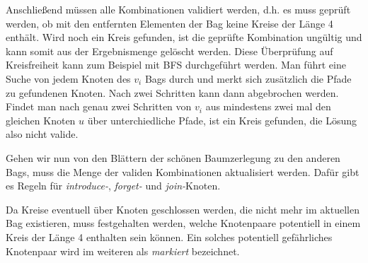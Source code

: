 Anschließend müssen alle Kombinationen validiert werden, d.h. es muss geprüft werden, ob mit den entfernten Elementen der Bag keine Kreise der Länge 4 enthält. Wird noch ein Kreis gefunden, ist die geprüfte Kombination ungültig und kann somit aus der Ergebnismenge gelöscht werden. Diese Überprüfung auf Kreisfreiheit kann zum Beispiel mit BFS durchgeführt werden. Man führt eine Suche von jedem Knoten des $v_i$ Bags durch und merkt sich zusätzlich die Pfade zu gefundenen Knoten. Nach zwei Schritten kann dann abgebrochen werden. Findet man nach genau zwei Schritten von $v_i$ aus mindestens zwei mal den gleichen Knoten $u$ über unterchiedliche Pfade, ist ein Kreis gefunden, die Lösung also nicht valide.

Gehen wir nun von den Blättern der schönen Baumzerlegung zu den anderen Bags, muss die Menge der validen Kombinationen aktualisiert werden. Dafür gibt es Regeln für \textit{introduce-}, \textit{forget-} und \textit{join-}Knoten. 

Da Kreise eventuell über Knoten geschlossen werden, die nicht mehr im aktuellen Bag existieren, muss festgehalten werden, welche Knotenpaare potentiell in einem Kreis der Länge 4 enthalten sein können. Ein solches potentiell gefährliches Knotenpaar wird im weiteren als \textit{markiert} bezeichnet.

